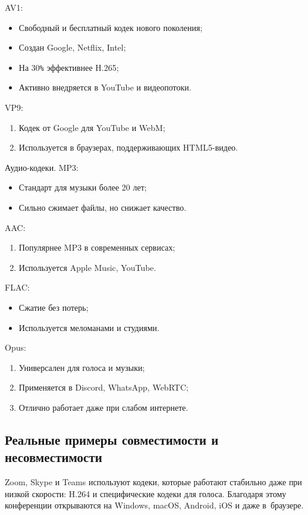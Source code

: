 \documentclass{ou}
\begin{document}
AV1:
\begin{itemize}[label=-, leftmargin=0em, itemindent=3.35em, nosep]
\item Свободный и бесплатный кодек нового поколения;
\item Создан Google, Netflix, Intel;
\item На 30\verb|%| эффективнее H.265;
\item Активно внедряется в YouTube и видеопотоки.
\end{itemize}

VP9:
\begin{enumerate}[leftmargin=0em, itemindent=3.75em, nosep, label=\arabic*)]
\item Кодек от Google для YouTube и WebM;
\item Используется в браузерах, поддерживающих HTML5-видео.
\end{enumerate}

Аудио-кодеки. MP3:
\begin{itemize}[label=-, leftmargin=0em, itemindent=3.35em, nosep]
\item Стандарт для музыки более 20 лет;
\item Сильно сжимает файлы, но снижает качество.
\end{itemize}

AAC:
\begin{enumerate}[leftmargin=0em, itemindent=3.75em, nosep, label=\arabic*)]
\item Популярнее MP3 в современных сервисах;
\item Используется Apple Music, YouTube.
\end{enumerate}

FLAC:
\begin{itemize}[label=-, leftmargin=0em, itemindent=3.35em, nosep]
\item Сжатие без потерь;
\item Используется меломанами и студиями.
\end{itemize}

Opus:
\begin{enumerate}[leftmargin=0em, itemindent=3.75em, nosep, label=\arabic*)]
\item Универсален для голоса и музыки;
\item Применяется в Discord, WhatsApp, WebRTC;
\item Отлично работает даже при слабом интернете.
\end{enumerate}
\subsection{Реальные примеры совместимости и несовместимости}
Zoom, Skype и Teams используют кодеки, которые работают стабильно даже при низкой скорости: H.264 и специфические кодеки для голоса. Благодаря этому конференции открываются на Windows, macOS, Android, iOS и даже в~браузере.
\end{document}

